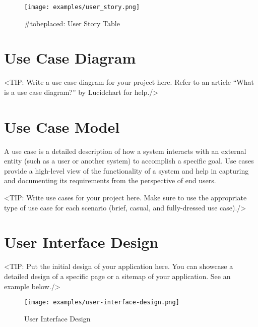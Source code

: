 \begin{figure}[h]
    \centering
    \texttt{[image: examples/user\_story.png]}
    \caption{#tobeplaced: User Story Table} 
\end{figure}

\section{Use Case Diagram}
\label{section:use-case-diagram}
<TIP: Write a use case diagram for your project here. Refer to an
article “What is a use case diagram?” by Lucidchart for help./>

\section{Use Case Model}
\label{section:use-case-model}
A use case is a detailed description of how a system
interacts with an external entity (such as a user or another system) to
accomplish a specific goal. Use cases provide a high-level view of the
functionality of a system and help in capturing and documenting its
requirements from the perspective of end users.

<TIP: Write use cases for your project here. Make sure to use the
appropriate type of use case for each scenario (brief, casual, and fully-dressed
use case)./>

\section{User Interface Design}
\label{section:user-interface-design}
<TIP: Put the initial design of your application here. You can
showcase a detailed design of a specific page or a sitemap of your application.
See an example below./>

\begin{figure}[h]
    \centering
    \texttt{[image: examples/user-interface-design.png]}
    \caption{User Interface Design}
\end{figure}
